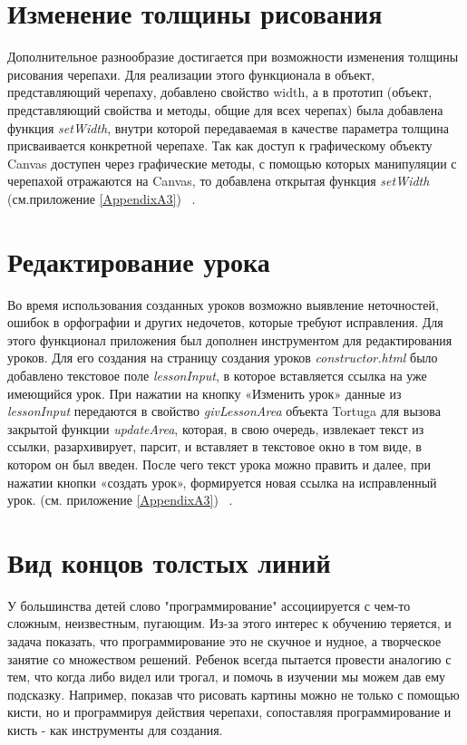 \section{Изменение толщины рисования} \label{sect1_1}

Дополнительное разнообразие достигается при возможности изменения толщины рисования черепахи. Для реализации этого функционала в объект, представляющий черепаху, добавлено свойство width, а в прототип (объект, представляющий свойства и методы, общие для всех черепах) была добавлена функция \textit{setWidth}, внутри которой передаваемая в качестве параметра толщина присваивается конкретной черепахе. Так как доступ к графическому объекту Canvas доступен через графические методы, с помощью которых манипуляции с черепахой отражаются на Canvas, то добавлена открытая функция \textit{setWidth} (см.приложение \ref{AppendixA3}) ~\cite{prototype}.

\section{Редактирование урока} \label{sect1_1}

Во время использования созданных уроков возможно выявление  неточностей, ошибок в орфографии и других недочетов, которые требуют исправления. Для этого функционал приложения был дополнен инструментом для редактирования уроков. Для его создания на страницу создания уроков \textit{constructor.html} было добавлено текстовое поле \textit{lessonInput}, в которое вставляется ссылка на уже имеющийся урок. При нажатии на кнопку «Изменить урок» данные из \textit{lessonInput} передаются в свойство \textit{givLessonArea} объекта Tortuga для вызова закрытой функции \textit{updateArea}, которая, в свою очередь,  извлекает текст из ссылки, разархивирует, парсит, и вставляет в текстовое окно в том виде, в котором он был введен. После чего текст урока можно править и далее, при нажатии кнопки «создать урок», формируется новая ссылка на исправленный урок. (см. приложение \ref{AppendixA3}) ~\cite{elementsdom, string}.


\section{Вид концов толстых линий} \label{sect1_1}
У большинства детей  слово "программирование" ассоциируется с чем-то сложным, неизвестным, пугающим. Из-за этого интерес к обучению теряется, и задача показать, что программирование это не скучное и нудное, а творческое занятие со множеством решений. Ребенок всегда пытается провести аналогию с тем, что когда либо видел или трогал, и помочь в изучении мы можем дав ему подсказку. Например, показав что рисовать картины можно не только с помощью  кисти, но и программируя действия черепахи, сопоставляя программирование и  кисть -  как инструменты для создания.

